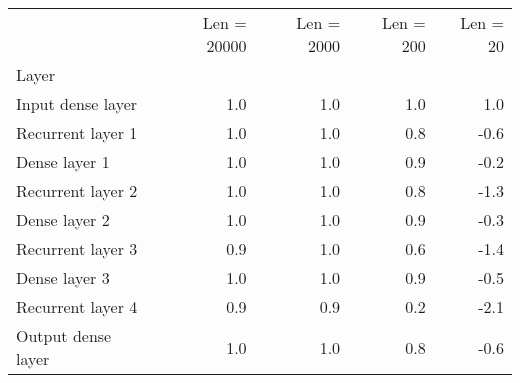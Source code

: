 \begin{tabular}{lrrrr}
\toprule
{} &  Len  = 20000 &  Len  = 2000 &  Len  = 200 &  Len  = 20 \\
Layer              &               &              &             &            \\
\midrule
Input dense layer  &           1.0 &          1.0 &         1.0 &        1.0 \\
Recurrent layer 1  &           1.0 &          1.0 &         0.8 &       -0.6 \\
Dense layer 1      &           1.0 &          1.0 &         0.9 &       -0.2 \\
Recurrent layer 2  &           1.0 &          1.0 &         0.8 &       -1.3 \\
Dense layer 2      &           1.0 &          1.0 &         0.9 &       -0.3 \\
Recurrent layer 3  &           0.9 &          1.0 &         0.6 &       -1.4 \\
Dense layer 3      &           1.0 &          1.0 &         0.9 &       -0.5 \\
Recurrent layer 4  &           0.9 &          0.9 &         0.2 &       -2.1 \\
Output dense layer &           1.0 &          1.0 &         0.8 &       -0.6 \\
\bottomrule
\end{tabular}

